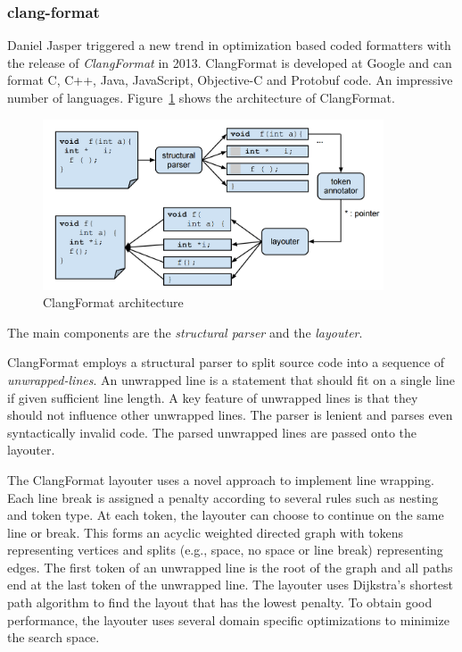 \subsubsection{clang-format}
Daniel Jasper triggered a new trend in optimization based coded formatters with the release of \emph{ClangFormat}\autocite{jasper_clang-format_2014} in 2013.
ClangFormat is developed at Google and can format C, C++, Java, JavaScript, Objective-C and Protobuf code.
An impressive number of languages.
Figure~\ref{fig:clang_format} shows the architecture of ClangFormat.
\begin{figure}
  \centering
  \includegraphics[width=0.9\textwidth]{img/clang-format.png}
  \caption{ClangFormat architecture}
  \label{fig:clang_format}
\end{figure}
The main components are the \emph{structural parser} and the \emph{layouter}.

ClangFormat employs a structural parser to split source code into a sequence of \emph{unwrapped-lines}.
An unwrapped line is a statement that should fit on a single line if given sufficient line length.
A key feature of unwrapped lines is that they should not influence other unwrapped lines.
The parser is lenient and parses even syntactically invalid code.
The parsed unwrapped lines are passed onto the layouter.

The ClangFormat layouter uses a novel approach to implement line wrapping.
Each line break is assigned a penalty according to several rules such as nesting and token type.
At each token, the layouter can choose to continue on the same line or break.
This forms an acyclic weighted directed graph with tokens representing vertices and splits (e.g., space, no space or line break) representing edges.
The first token of an unwrapped line is the root of the graph and all paths end at the last token of the unwrapped line.
The layouter uses Dijkstra's\autocite{dijkstra_note_1959} shortest path algorithm to find the layout that has the lowest penalty.
To obtain good performance, the layouter uses several domain specific optimizations to minimize the search space.

